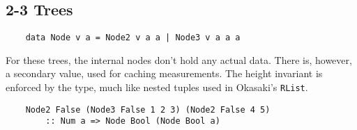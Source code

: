 \subsection{2-3 Trees}

\begin{verbatim}
    data Node v a = Node2 v a a | Node3 v a a a
\end{verbatim}

For these trees, the internal nodes don't hold any actual data. There is, however, a secondary value, used for caching measurements. The height invariant is enforced by the type, much like nested tuples used in Okasaki's \texttt{RList}.

\begin{verbatim}
    Node2 False (Node3 False 1 2 3) (Node2 False 4 5) 
        :: Num a => Node Bool (Node Bool a)
\end{verbatim}